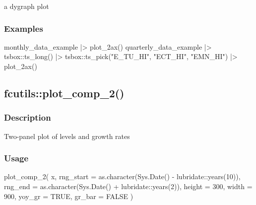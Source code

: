 \documentclass[
  letterpaper,
  DIV=11,
  numbers=noendperiod]{scrreport}
\newenvironment{Shaded}{\begin{snugshade}}{\end{snugshade}}
\newcommand{\AttributeTok}[1]{\textcolor[rgb]{0.40,0.45,0.13}{#1}}
\newcommand{\ConstantTok}[1]{\textcolor[rgb]{0.56,0.35,0.01}{#1}}
\newcommand{\DecValTok}[1]{\textcolor[rgb]{0.68,0.00,0.00}{#1}}
\newcommand{\FunctionTok}[1]{\textcolor[rgb]{0.28,0.35,0.67}{#1}}
\newcommand{\NormalTok}[1]{\textcolor[rgb]{0.00,0.23,0.31}{#1}}
\newcommand{\SpecialCharTok}[1]{\textcolor[rgb]{0.37,0.37,0.37}{#1}}
\newcommand{\StringTok}[1]{\textcolor[rgb]{0.13,0.47,0.30}{#1}}
\begin{document}
a dygraph plot

\subsubsection{Examples}\label{examples-64}

\begin{Shaded}
\begin{Highlighting}[]
\NormalTok{monthly\_data\_example }\SpecialCharTok{|\textgreater{}}
  \FunctionTok{plot\_2ax}\NormalTok{()}
\NormalTok{quarterly\_data\_example }\SpecialCharTok{|\textgreater{}}
\NormalTok{  tsbox}\SpecialCharTok{::}\FunctionTok{ts\_long}\NormalTok{() }\SpecialCharTok{|\textgreater{}}
\NormalTok{  tsbox}\SpecialCharTok{::}\FunctionTok{ts\_pick}\NormalTok{(}\StringTok{"E\_TU\_HI"}\NormalTok{, }\StringTok{"ECT\_HI"}\NormalTok{, }\StringTok{"EMN\_HI"}\NormalTok{) }\SpecialCharTok{|\textgreater{}}
  \FunctionTok{plot\_2ax}\NormalTok{()}
\end{Highlighting}
\end{Shaded}

\subsection{fcutils::plot\_comp\_2()}\label{fcutilsplot_comp_2}

\subsubsection{Description}\label{description-65}

Two-panel plot of levels and growth rates

\subsubsection{Usage}\label{usage-65}

\begin{Shaded}
\begin{Highlighting}[]
\FunctionTok{plot\_comp\_2}\NormalTok{(}
\NormalTok{  x,}
  \AttributeTok{rng\_start =} \FunctionTok{as.character}\NormalTok{(}\FunctionTok{Sys.Date}\NormalTok{() }\SpecialCharTok{{-}}\NormalTok{ lubridate}\SpecialCharTok{::}\FunctionTok{years}\NormalTok{(}\DecValTok{10}\NormalTok{)),}
  \AttributeTok{rng\_end =} \FunctionTok{as.character}\NormalTok{(}\FunctionTok{Sys.Date}\NormalTok{() }\SpecialCharTok{+}\NormalTok{ lubridate}\SpecialCharTok{::}\FunctionTok{years}\NormalTok{(}\DecValTok{2}\NormalTok{)),}
  \AttributeTok{height =} \DecValTok{300}\NormalTok{,}
  \AttributeTok{width =} \DecValTok{900}\NormalTok{,}
  \AttributeTok{yoy\_gr =} \ConstantTok{TRUE}\NormalTok{,}
  \AttributeTok{gr\_bar =} \ConstantTok{FALSE}
\NormalTok{)}
\end{Highlighting}
\end{Shaded}
\end{document}
